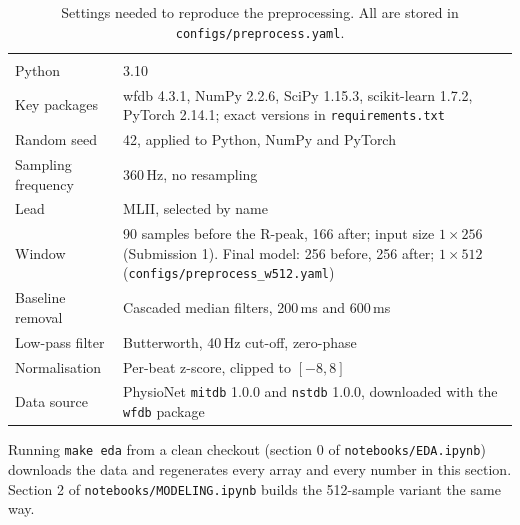\begin{table}[H]
  \centering
  \caption{Settings needed to reproduce the preprocessing. All are stored in \texttt{configs/preprocess.yaml}.}
  \label{tab:reproducibility}
  \begin{tabularx}{\linewidth}{l Y}
     &  \\
    Python             & 3.10 \\
    Key packages       & wfdb 4.3.1, NumPy 2.2.6, SciPy 1.15.3, scikit-learn 1.7.2, PyTorch 2.14.1; exact versions in \texttt{requirements.txt} \\
    Random seed        & 42, applied to Python, NumPy and PyTorch \\
    Sampling frequency & 360\,Hz, no resampling \\
    Lead               & MLII, selected by name \\
    Window             & 90 samples before the R-peak, 166 after; input size $1 \times 256$ (Submission 1). Final model: 256 before, 256 after; $1 \times 512$ (\texttt{configs/preprocess\_w512.yaml}) \\
    Baseline removal   & Cascaded median filters, 200\,ms and 600\,ms \\
    Low-pass filter    & Butterworth, 40\,Hz cut-off, zero-phase \\
    Normalisation      & Per-beat z-score, clipped to $[-8, 8]$ \\
    Data source        & PhysioNet \texttt{mitdb} 1.0.0 and \texttt{nstdb} 1.0.0, downloaded with the \texttt{wfdb} package \\
    \bottomrule
  \end{tabularx}

\end{table}

Running \texttt{make eda} from a clean checkout (section 0 of \texttt{notebooks/EDA.ipynb}) downloads the data and regenerates every array and every number in this section. Section 2 of \texttt{notebooks/MODELING.ipynb} builds the 512-sample variant the same way.
